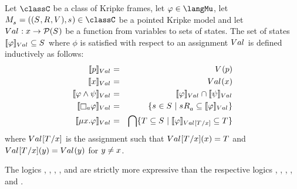 \begin{definition}\label{mu-semantics}
Let $\classC$ be a class of Kripke frames, let $\phi \in \langMu$, let $\kPModelAndTuple{\kStateS} \in \classC$ be a pointed Kripke model and let $\kAssignment : \varX \to \powerset(\kStates)$ be a function from variables to sets of states.
The set of states $\interpretation[\kAssignment]{\phi} \subseteq \kStates$ where $\phi$ is satisfied with respect to an assignment $\kAssignment$ is defined inductively as follows:
\begin{eqnarray*}
    \interpretation[\kAssignment]{\atomP} &=& \kValuation(\atomP)\\
    \interpretation[\kAssignment]{\varX} &=& \kAssignment(\varX)\\
    \interpretation[\kAssignment]{\phi \land \psi} &=& \interpretation[\kAssignment]{\phi} \cap \interpretation[\kAssignment]{\psi}\\
    \interpretation[\kAssignment]{\necessaryA \phi} &=& \{ \kStateS \in \kStates \mid \kStateS \kAccessibility{\agentA} \subseteq \interpretation[\kAssignment]{\phi} \}\\
    \interpretation[\kAssignment]{\lfp{\varX} \phi} &=& \bigcap \{ \kStatesT \subseteq \kStates \mid \interpretation[\kAssignmentSubstitute{\kStatesT}{\varX}]{\phi} \subseteq \kStatesT \}
\end{eqnarray*}
where $\kAssignmentSubstitute{\kStatesT}{\varX}$ is the assignment such that $\kAssignmentSubstitute{\kStatesT}{\varX}(\varX) = \kStatesT$ and $\kAssignmentSubstitute{\kStatesT}{\varX}(\varY) = \kAssignment(\varY)$ for $y \neq x$. 
\end{definition}

\begin{proposition}
The logics \logicMuK{}, \logicMuKF{}, \logicMuKFF{}, \logicMuKD{}, \logicMuSF{} and \logicMuS{} are strictly more expressive than the respective logics \logicK{}, \logicKF{}, \logicKFF{}, \logicKD{}, \logicSF{} and \logicS{}.
\end{proposition}
